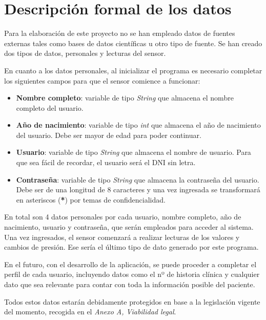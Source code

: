 

\section{Descripción formal de los datos}
Para la elaboración de este proyecto no se han empleado datos de fuentes externas tales como bases de datos científicas u otro tipo de fuente. Se han creado dos tipos de datos, personales y lecturas del sensor.

En cuanto a los datos personales, al inicializar el programa es necesario completar los siguientes campos para que el sensor comience a funcionar:
\begin{itemize}
    \item \textbf{Nombre completo}: variable de tipo \textit{String} que almacena el nombre completo del usuario.
    \item \textbf{Año de nacimiento}: variable de tipo \textit{int} que almacena el año de nacimiento del usuario. Debe ser mayor de edad para poder continuar.
    \item \textbf{Usuario}: variable de tipo \textit{String} que almacena el nombre de usuario. Para que sea fácil de recordar, el usuario será el DNI sin letra.
    \item \textbf{Contraseña}: variable de tipo \textit{String} que almacena la contraseña del usuario. Debe ser de una longitud de 8 caracteres y una vez ingresada se transformará en asteriscos (\textbf{*}) por temas de confidencialidad.
\end{itemize}

En total son 4 datos personales por cada usuario, nombre completo, año de nacimiento, usuario y contraseña, que serán empleados para acceder al sistema. Una vez ingresados, el sensor comenzará a realizar lecturas de los valores y cambios de presión. Ese sería el último tipo de dato generado por este programa.

En el futuro, con el desarrollo de la aplicación, se puede proceder a completar el perfil de cada usuario, incluyendo datos como el nº de historia clínica y cualquier dato que sea relevante para contar con toda la información posible del paciente.

Todos estos datos estarán debidamente protegidos en base a la legislación vigente del momento, recogida en el \textit{Anexo A, Viabilidad legal}.